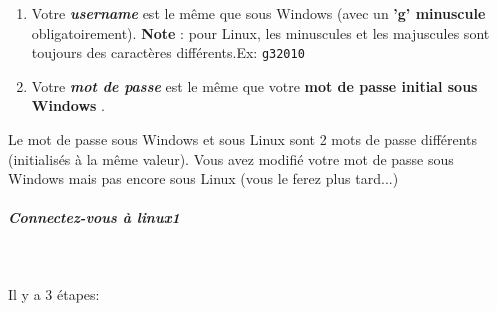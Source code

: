 \documentclass[11pt,a4paper]{article}
\begin{document}
					\begin{enumerate}
				
			\item Votre  \textbf{ \textit{username} }  est le m\^eme que sous Windows (avec un  \textbf{'g' minuscule}  obligatoirement).  \textbf{Note}  : pour Linux, les minuscules et les majuscules sont toujours des caract\`eres diff\'erents.Ex:  \texttt{g32010} 
			\item Votre  \textit{ \textbf{mot de passe} }  est le m\^eme que votre  \textbf{mot de passe initial sous Windows} .
					\end{enumerate}
				
  

Le mot de passe sous Windows et sous Linux sont 2 mots de passe
diff\'erents (initialis\'es \`a la m\^eme valeur). Vous avez modifi\'e votre mot
de passe sous Windows mais pas encore sous Linux (vous le ferez plus
tard...)

  
			
		\subparagraph{Connectez-vous \`a linux1} 
		
					\textcolor{white}{.} \par
				
            \par
        
Il y a 3 \'etapes:
\end{document}
